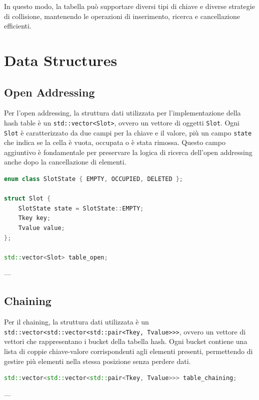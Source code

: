 In questo modo, la tabella può supportare diversi tipi di chiave e diverse strategie di collisione, 
mantenendo le operazioni di inserimento, ricerca e cancellazione efficienti.


\section{Data Structures}

\subsection{Open Addressing}

Per l'open addressing, la struttura dati utilizzata per l'implementazione della hash table è un \texttt{std::vector<Slot>}, 
ovvero un vettore di oggetti \texttt{Slot}.  
Ogni \texttt{Slot} è caratterizzato da due campi per la chiave e il valore, più un campo \texttt{state} 
che indica se la cella è vuota, occupata o è stata rimossa.  
Questo campo aggiuntivo è fondamentale per preservare la logica di ricerca dell'open addressing anche dopo la cancellazione di elementi.

\begin{lstlisting}[language=C++, caption=Open Addressing Data Structure]
enum class SlotState { EMPTY, OCCUPIED, DELETED };

struct Slot {
    SlotState state = SlotState::EMPTY;
    Tkey key;
    Tvalue value;
};

std::vector<Slot> table_open;
\end{lstlisting}

---

\subsection{Chaining}

Per il chaining, la struttura dati utilizzata è un \texttt{std::vector<std::vector<std::pair<Tkey, Tvalue>>>},  
ovvero un vettore di vettori che rappresentano i bucket della tabella hash.  
Ogni bucket contiene una lista di coppie chiave-valore corrispondenti agli elementi presenti, permettendo di gestire più elementi nella stessa posizione senza perdere dati.

\begin{lstlisting}[language=C++, caption=Chaining Data Structure]
std::vector<std::vector<std::pair<Tkey, Tvalue>>> table_chaining;
\end{lstlisting}

---

